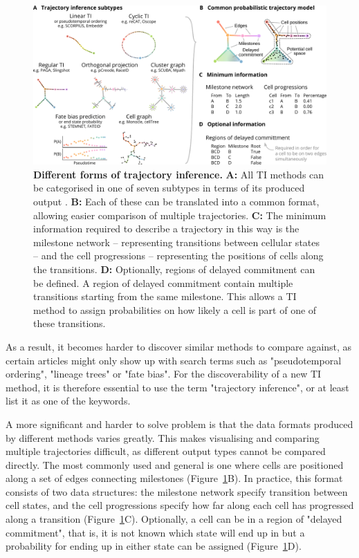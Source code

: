 \begin{figure}[htb!]
	\centering
	\includegraphics[width=\linewidth]{fig/method_types.pdf} 
	\caption{
		\textbf{Different forms of trajectory inference.}
		\textbf{A:} All TI methods can be categorised in one of seven subtypes in terms of its produced output \cite{saelens_comparisonsinglecelltrajectory_2019}.
		\textbf{B:} Each of these can be translated into a common format, allowing easier comparison of multiple trajectories.
		\textbf{C:} The minimum information required to describe a trajectory in this way is the milestone network -- representing transitions between cellular states -- and the cell progressions -- representing the positions of cells along the transitions.
		\textbf{D:} Optionally, regions of delayed commitment can be defined. A region of delayed commitment contain multiple transitions starting from the same milestone. This allows a TI method to assign probabilities on how likely a cell is part of one of these transitions.
	}
	\label{fig:method_types}
\end{figure}

As a result, it becomes harder to discover similar methods to compare against, as certain articles might only show up with search terms such as "pseudotemporal ordering", "lineage trees" or "fate bias". For the discoverability of a new TI method, it is therefore essential to use the term "trajectory inference", or at least list it as one of the keywords. 

A more significant and harder to solve problem is that the data formats produced by different methods varies greatly. This makes visualising and comparing multiple trajectories difficult, as different output types cannot be compared directly. The most commonly used and general is one where cells are positioned along a set of edges connecting milestones (Figure~\ref{fig:method_types}B). In practice, this format consists of two data structures: the milestone network specify transition between cell states, and the cell progressions specify how far along each cell has progressed along a transition (Figure~\ref{fig:method_types}C). Optionally, a cell can be in a region of "delayed commitment", that is, it is not known which state will end up in but a probability for ending up in either state can be assigned (Figure~\ref{fig:method_types}D). 

